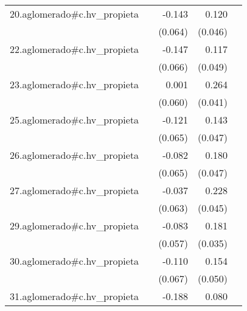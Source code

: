 {\begin{longtable}{l*{4}{D{.}{.}{-1}}}
\addlinespace
20.aglomerado#c.hv\_propieta&                     &      -0.143\sym{*}  &       0.120\sym{**} &                     \\
            &                     &     (0.064)         &     (0.046)         &                     \\
\addlinespace
22.aglomerado#c.hv\_propieta&                     &      -0.147\sym{*}  &       0.117\sym{*}  &                     \\
            &                     &     (0.066)         &     (0.049)         &                     \\
\addlinespace
23.aglomerado#c.hv\_propieta&                     &       0.001         &       0.264\sym{***}&                     \\
            &                     &     (0.060)         &     (0.041)         &                     \\
\addlinespace
25.aglomerado#c.hv\_propieta&                     &      -0.121         &       0.143\sym{**} &                     \\
            &                     &     (0.065)         &     (0.047)         &                     \\
\addlinespace
26.aglomerado#c.hv\_propieta&                     &      -0.082         &       0.180\sym{***}&                     \\
            &                     &     (0.065)         &     (0.047)         &                     \\
\addlinespace
27.aglomerado#c.hv\_propieta&                     &      -0.037         &       0.228\sym{***}&                     \\
            &                     &     (0.063)         &     (0.045)         &                     \\
\addlinespace
29.aglomerado#c.hv\_propieta&                     &      -0.083         &       0.181\sym{***}&                     \\
            &                     &     (0.057)         &     (0.035)         &                     \\
\addlinespace
30.aglomerado#c.hv\_propieta&                     &      -0.110         &       0.154\sym{**} &                     \\
            &                     &     (0.067)         &     (0.050)         &                     \\
\addlinespace
31.aglomerado#c.hv\_propieta&                     &      -0.188\sym{**} &       0.080         &                     \\

\end{longtable}}
